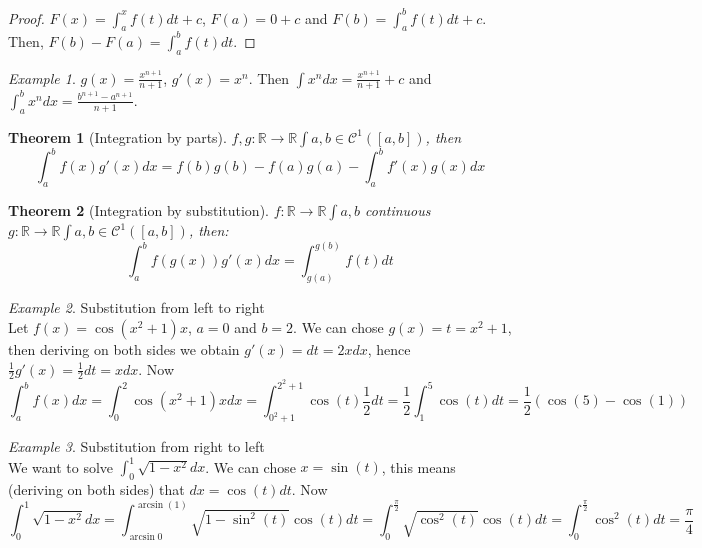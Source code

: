 \documentclass{article}
\newcommand{\fOnR}[1]{#1 : \mathbb{R} \rightarrow \mathbb{R}}
\newcommand{\intcc}[1]{\left[#1\right]}
\theoremstyle{definition}
\theoremstyle{definition}
\theoremstyle{plain}
\newtheorem{theorem}{Theorem}[section]
\theoremstyle{plain}
\theoremstyle{plain}
\theoremstyle{plain}
\theoremstyle{definition}
\theoremstyle{remark}
\theoremstyle{remark}
\theoremstyle{remark}
\newtheorem{examplet}{Example}[theorem]
\theoremstyle{remark}
\newcommand{\C}{\mathcal{C}}
\begin{document}
\begin{proof}
  $F(x) = \int_a^x f(t) dt + c$, $F(a) = 0 + c$ and $F(b) = \int_a^b f(t) dt + c$. Then, $F(b) - F(a) = \int_a^b f(t) dt$.
\end{proof}

\begin{examplet}
  $g(x) = \frac{x^{n+1}}{n+1}$, $g'(x) = x^n$. Then $\int x^n dx = \frac{x^{n+1}}{n+1} + c$ and $\int_a^b x^n dx = \frac{b^{n+1} - a^{n+1}}{n+1}$.
\end{examplet}


\begin{theorem}[Integration by parts]
  $\fOnR{f,g}{\int{a,b}} \in \C^1(\intcc{a,b})$, then
  \[
  \int_a^b f(x) g'(x) dx = f(b)g(b) - f(a)g(a) - \int_a^b f'(x)g(x) dx
  \]
\end{theorem}


\begin{theorem}[Integration by substitution]
  $\fOnR{f}{\int{a,b}}$ continuous $\fOnR{g}{\int{a,b}} \in \C^1(\intcc{a,b})$, then:
  \[
    \int_a^b f(g(x))g'(x) dx = \int_{g(a)}^{g(b)} f(t) dt
  \]
\end{theorem}

\begin{examplet}
  Substitution from left to right\\
  Let $f(x) = \cos(x^2 + 1) x$, $a = 0$ and $b = 2$. We can chose $g(x) = t = x^2 + 1$, then deriving on both sides we obtain $g'(x) = dt = 2x dx$, hence $\frac{1}{2} g'(x) = \frac{1}{2} dt = x dx$. Now
  \[
  \int_a^b f(x) dx =
  \int_0^2 \cos(x^2 + 1) x dx =
  \int_{0^2+1}^{2^2+1} \cos(t) \frac{1}{2} dt =
  \frac{1}{2} \int_1^5 \cos(t) dt =
  \frac{1}{2} \left(\cos(5) - \cos(1)\right)
  \]
\end{examplet}

\begin{examplet}
  Substitution from right to left\\
  We want to solve $\int_0^1 \sqrt{1-x^2}dx$. We can chose $x = \sin(t)$, this means (deriving on both sides) that $dx = \cos(t)dt$. Now
  \[
  \int_0^1 \sqrt{1-x^2} dx =
  \int_{\arcsin{0}}^{\arcsin(1)} \sqrt{1-\sin^2(t)} \cos(t) dt =
  \int_0^{\frac{\pi}{2}} \sqrt{\cos^2(t)} \cos(t) dt =
  \int_0^{\frac{\pi}{2}} \cos^2(t) dt =
  \frac{\pi}{4}
  \]
\end{examplet}


\end{document}
